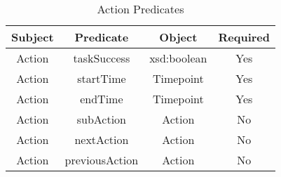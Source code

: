 \begin{table}[H]
	\begin{tabular}{| c | c | c | c |}
		\hline			
		\textbf{Subject} & \textbf{Predicate} & \textbf{Object}  & \textbf{Required} \\
		\hline
		Action & taskSuccess & xsd:boolean & Yes \\
		\hline
		Action & startTime & Timepoint & Yes \\
		\hline
		Action & endTime & Timepoint  & Yes \\
		\hline
		Action & subAction & Action & No \\
		\hline
		Action & nextAction & Action & No \\
		\hline
		Action & previousAction & Action & No \\
		\hline
	\end{tabular}
	\caption{Action Predicates}
	\label{table:action_task_predicates}
\end{table}

